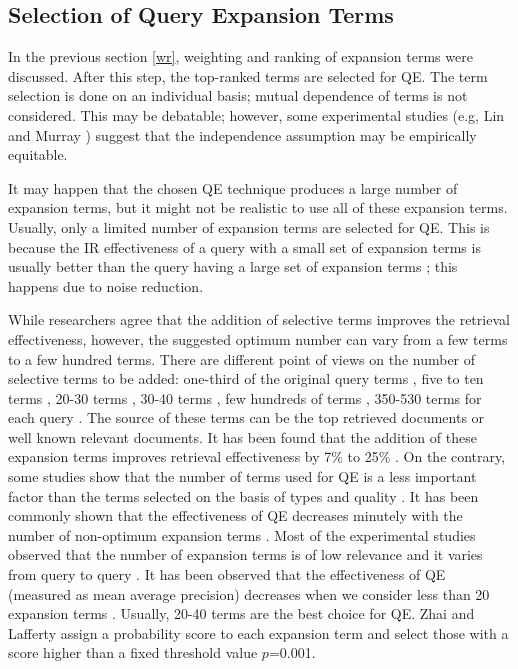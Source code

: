 \subsection{Selection of Query Expansion Terms}
In the previous section \ref{wr}, weighting and ranking of expansion terms were discussed. After this step, the top-ranked terms are selected for QE. The term selection is done on an individual basis; mutual dependence of terms is not considered. This may be debatable; however, some experimental studies (e.g, Lin and Murray \cite{lin2005assessing}) suggest that the independence assumption may be empirically equitable.

It may happen that the chosen QE technique produces a large number of expansion terms, but it might not be realistic to use all of these expansion terms. Usually, only a limited number of expansion terms are selected for QE. This is because the IR effectiveness of a query with a small set of expansion terms is usually better than the query having a large set of expansion terms  \cite{salton1997improving}; this happens due to noise reduction. 

While researchers agree that the addition of selective terms improves the retrieval effectiveness, however, the suggested optimum number can vary from a few terms to a few hundred terms. There are different point of views on the number of selective terms to be added: one-third of the original query terms \cite{robertson1993comparison}, five to ten terms \cite{amati2003probabilistic,chang2006query}, 20-30 terms \cite{harman1992relevance,zhang2016learning}, 30-40 terms \cite{paik2014incremental}, few hundreds of terms \cite{bernardini2008fub,wong2008re}, 350-530 terms for each query \cite{buckley1995automatic}. The source of these terms  can be the top retrieved documents or well known relevant documents. It has been found that the addition of these expansion terms improves retrieval effectiveness by 7\% to 25\% \cite{buckley1995automatic}. On the contrary, some studies show that the number of terms used for QE is a less important factor than the terms selected on the basis of types and quality \cite{sihvonen2004subject}. It has been commonly shown that the effectiveness of QE decreases minutely with the number of non-optimum  expansion terms \cite{carpineto2001information}. Most of the experimental studies observed that the number of expansion terms is of low relevance and it varies from query to query \cite{billerbeck2004questioning,buckley2004reliable,billerbeck2003query,cao2008selecting}. It has been observed that the effectiveness of QE (measured as mean average precision) decreases when we consider less than 20 expansion terms \cite{paik2014incremental,zhang2016learning}. Usually, 20-40 terms are the best choice for QE. Zhai and Lafferty \cite{zhai2001model} assign a probability score to each expansion term and select those with a score higher than a fixed threshold value $p$=0.001.


